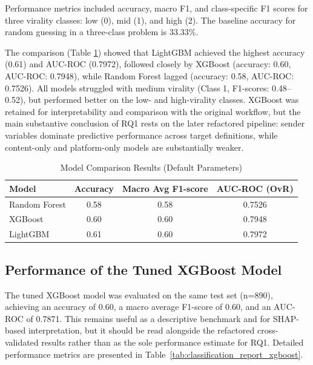 \documentclass[12pt,a4paper]{report}
\begin{document}
Performance metrics included accuracy, macro F1, and class-specific F1 scores for three virality classes: low (0), mid (1), and high (2). The baseline accuracy for random guessing in a three-class problem is 33.33\%.

The comparison (Table \ref{tab:model_performance}) showed that LightGBM achieved the highest accuracy (0.61) and AUC-ROC (0.7972), followed closely by XGBoost (accuracy: 0.60, AUC-ROC: 0.7948), while Random Forest lagged (accuracy: 0.58, AUC-ROC: 0.7526). All models struggled with medium virality (Class 1, F1-scores: 0.48--0.52), but performed better on the low- and high-virality classes. XGBoost was retained for interpretability and comparison with the original workflow, but the main substantive conclusion of RQ1 rests on the later refactored pipeline: sender variables dominate predictive performance across target definitions, while content-only and platform-only models are substantially weaker.

\begin{table}[h]
\centering
\caption{Model Comparison Results (Default Parameters)}
\label{tab:model_performance}
\begin{tabular}{lccc}
\toprule
\textbf{Model} & \textbf{Accuracy} & \textbf{Macro Avg F1-score} & \textbf{AUC-ROC (OvR)} \\
\midrule
Random Forest & 0.58 & 0.58 & 0.7526 \\
XGBoost       & 0.60 & 0.60 & 0.7948 \\
LightGBM      & 0.61 & 0.60 & 0.7972 \\
\bottomrule
\end{tabular}
\end{table}


\subsection{Performance of the Tuned XGBoost Model}
The tuned XGBoost model was evaluated on the same test set (n=890), achieving an accuracy of 0.60, a macro average F1-score of 0.60, and an AUC-ROC of 0.7871. This remains useful as a descriptive benchmark and for SHAP-based interpretation, but it should be read alongside the refactored cross-validated results rather than as the sole performance estimate for RQ1. Detailed performance metrics are presented in Table~\ref{tab:classification_report_xgboost}. 
\end{document}
